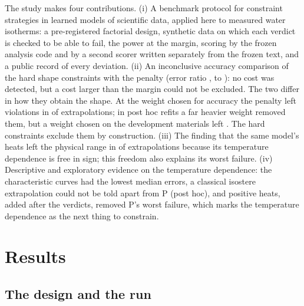 \documentclass[journal=jcisd8,manuscript=article]{achemso}
\begin{document}
The study makes four contributions. (i) A benchmark protocol for constraint strategies in learned models of
scientific data, applied here to measured water isotherms: a pre-registered factorial design, synthetic data on
which each verdict is checked to be able to fail, the power at the margin, scoring by the frozen analysis code and
by a second scorer written separately from the frozen text, and a public record of every deviation. (ii) An
inconclusive accuracy comparison of the hard shape constraints with the penalty (error ratio ,
 to ): no cost was detected, but a cost larger than the margin could not be
excluded. The two differ in how they obtain the shape. At the weight chosen for accuracy the penalty left violations
in  of  extrapolations; in post hoc refits a far heavier weight removed them, but a
weight chosen on the development materials left . The hard constraints exclude them by construction. (iii) The finding that the same model's heats left the physical range in  of
 extrapolations because its temperature dependence is free in sign; this freedom also explains its
worst failure.
(iv) Descriptive and exploratory evidence on the temperature dependence: the characteristic curves had the lowest
median errors, a classical isostere extrapolation could not be told apart from P (post hoc), and positive heats, added after the
verdicts, removed P's worst failure, which marks the temperature dependence as the next thing to constrain.

\section*{Results}

\subsection*{The design and the run}
\end{document}
